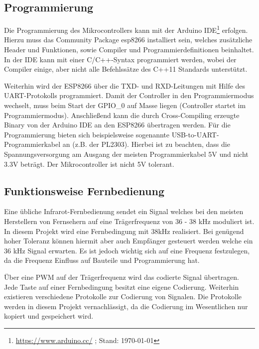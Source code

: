 \subsection{Programmierung}
Die Programmierung des Mikrocontrollers kann mit der Arduino \acs{IDE}\footnote{\url{https://www.arduino.cc/} ; Stand: \today} erfolgen. Hierzu muss das Community Package esp8266 installiert sein, welches zusätzliche Header und Funktionen, sowie Compiler und Programmierdefinitionen beinhaltet.
In der \acs{IDE} kann mit einer C/C++-Syntax programmiert werden, wobei der Compiler einige, aber nicht alle Befehlssätze des C++11 Standards unterstützt.

Weiterhin wird der ESP8266 über die \acs{TXD}- und \acs{RXD}-Leitungen mit Hilfe des \acs{UART}-Protokolls programmiert.
Damit der Controller in den Programmiermodus wechselt, muss beim Start der \acs{GPIO}\_0 auf Masse liegen (Controller startet im Programmiermodus).
Anschließend kann die durch Cross-Compiling erzeugte Binary von der Arduino IDE an den ESP8266 übertragen werden.
Für die Programmierung bieten sich beispielsweise sogenannte USB-to-\acs{UART}-Programmierkabel an (z.B. der PL2303).
Hierbei ist zu beachten, dass die Spannungsversorgung am Ausgang der meisten Programmierkabel 5V und nicht 3.3V beträgt. Der Mikrocontroller ist nicht 5V tolerant.

\subsection{Funktionsweise Fernbedienung}

Eine übliche Infrarot-Fernbedienung sendet ein Signal welches bei den meisten Herstellern von Fernsehern auf eine Trägerfrequenz von 36 - 38 kHz moduliert ist.
In diesem Projekt wird eine Fernbedingung mit 38kHz realisiert. Bei genügend hoher Toleranz können hiermit aber auch Empfänger gesteuert werden welche ein 36 kHz Signal erwarten.
Es ist jedoch wichtig sich auf eine Frequenz festzulegen, da die Frequenz Einfluss auf Bauteile und Programmierung hat.

Über eine \ac{PWM} auf der Trägerfrequenz wird das codierte Signal übertragen.
Jede Taste auf einer Fernbedingung besitzt eine eigene Codierung.
Weiterhin existieren verschiedene Protokolle zur Codierung von Signalen.
Die Protokolle werden in diesem Projekt vernachlässigt, da die Codierung im Wesentlichen nur kopiert und gespeichert wird.

